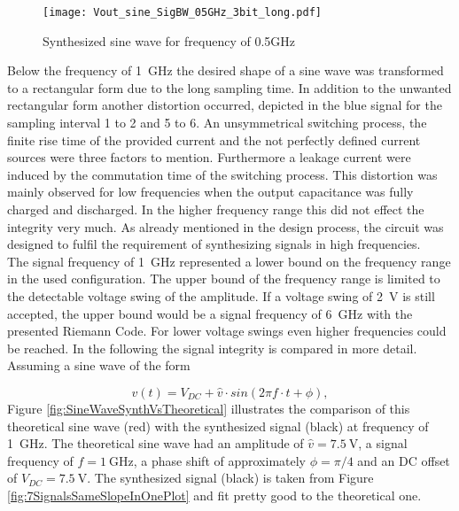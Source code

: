 \begin{figure}[htb!] %
   \centering
   \texttt{[image: Vout\_sine\_SigBW\_05GHz\_3bit\_long.pdf]}
   \caption{Synthesized sine wave for frequency of 0.5GHz}
   \label{fig:SineWave05GHz}
\end{figure}


Below the frequency of \SI{1}{\GHz} the desired shape of a sine wave was transformed to a rectangular  form due to the long sampling time.
In addition to the unwanted rectangular form another distortion occurred, depicted in the blue signal for the sampling interval 1 to 2 and 5 to 6.
An unsymmetrical switching process, the finite rise time of the provided current and the not perfectly defined current sources were three factors to mention. %
Furthermore a leakage current were induced by the commutation time of the switching process.
This distortion was mainly observed for low frequencies when the output capacitance was fully charged and discharged.
In the higher frequency range this did not effect the integrity very much.
As already mentioned in the design process, the circuit was designed to fulfil the requirement of synthesizing signals in high frequencies.\\
The signal frequency of \SI{1}{\giga \hertz} represented a lower bound on the frequency range in the used configuration. %
The upper bound of the frequency range is limited to the detectable voltage swing of the amplitude.
If a voltage swing of \SI{2}{\volt} is still accepted, the upper bound would be a signal frequency of \SI{6}{\GHz} with the presented Riemann Code.
For lower voltage swings even higher frequencies could be reached.
In the following the signal integrity is compared in more detail.
Assuming a sine wave of the form

\begin{equation}
	v(t)= V_{DC} + \widehat{v} \cdot sin( 2  \pi  f \cdot  t + \phi),
\end{equation}
Figure \ref{fig:SineWaveSynthVsTheoretical} illustrates the comparison of this theoretical sine wave (red) with the synthesized signal (black) at frequency of \SI{1}{\GHz}.
The theoretical sine wave had an amplitude of $\widehat{v} = \SI{7.5}{\volt}$, a signal frequency of $f = \SI{1}{\giga \hertz}$, a phase shift of approximately $\phi = \pi / 4$ and an DC offset of $V_{DC} = \SI{7.5}{\volt}$.
The synthesized signal (black) is taken from Figure \ref{fig:7SignalsSameSlopeInOnePlot} and fit pretty good to the theoretical one.

